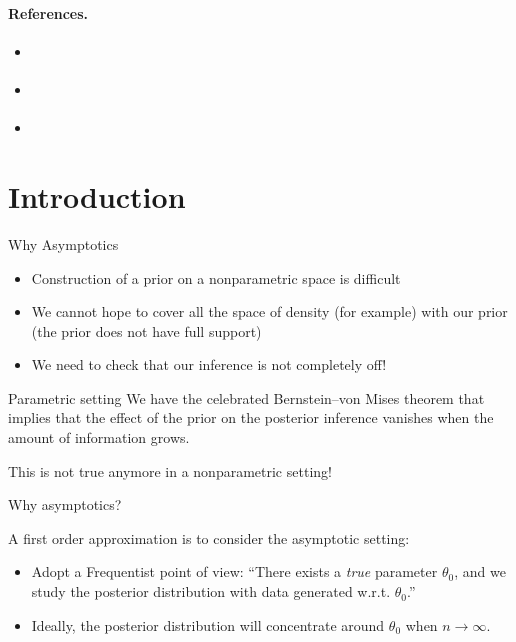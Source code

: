 \paragraph{References.}
\begin{itemize}
	\item \citet{Ghosh2003}
	\item \citet{hjort2010bayesian}
	\item \citet{ghosal2017fundamentals}
\end{itemize}


\section{Introduction}




{Why Asymptotics}

\begin{itemize}
\item Construction of a prior on a nonparametric space is difficult
\item We cannot hope to cover all the space of density (for example) with our prior (the prior does not have full support)
\item \alert{We need to check that our inference is not completely off! }
\end{itemize}
  
\begin{block}{Parametric setting}
We have the celebrated \alert{Bernstein--von Mises} theorem that implies that the effect of the prior on the posterior inference vanishes when the amount of information grows. 
\end{block}
\begin{center}
\alert{This is not true anymore in a nonparametric setting! }
\end{center}






{Why asymptotics?}

A first order approximation is to consider the asymptotic setting:

\begin{itemize}
\item Adopt a Frequentist point of view: ``There exists a \emph{true} parameter $\theta_0$, and we study the posterior distribution with data generated w.r.t. $\theta_0$.'' 
\item Ideally, the posterior distribution will \alert{concentrate} around $\theta_0$ when $n\to \infty$.
\end{itemize}






